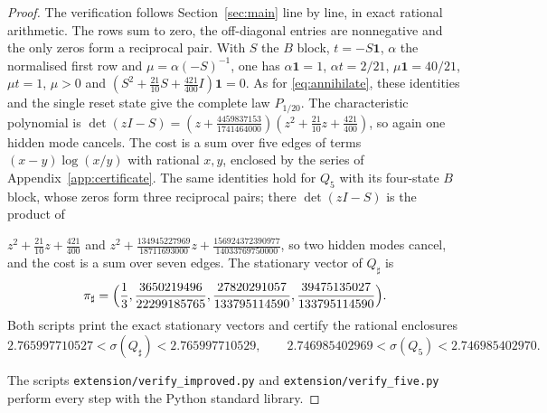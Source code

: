 \documentclass[11pt,a4paper]{article}
\theoremstyle{remark}\newtheorem{remark}[theorem]{Remark}
\newcommand{\one}{\mathbf 1}
\begin{document}
\begin{proof}
The verification follows Section~\ref{sec:main} line by line, in exact rational
arithmetic. The rows sum to zero, the off-diagonal entries are nonnegative and
the only zeros form a reciprocal pair. With $S$ the $B$ block,
$t=-S\one$, $\alpha$ the normalised first row and $\mu=\alpha(-S)^{-1}$,
one has $\alpha\one=1$, $\alpha t=2/21$, $\mu\one=40/21$, $\mu t=1$, $\mu>0$
and $(S^2+\tfrac{21}{10}S+\tfrac{421}{400}I)\one=0$. As for
\eqref{eq:annihilate}, these identities and the single reset state give the
complete law $P_{1/20}$. The characteristic polynomial is
$\det(zI-S)=(z+\tfrac{4459837153}{1741464000})(z^2+\tfrac{21}{10}z+\tfrac{421}{400})$,
so again one hidden mode cancels. The cost is a sum over five edges of terms
$(x-y)\log(x/y)$ with rational $x,y$, enclosed by the series of
Appendix~\ref{app:certificate}. The same identities hold for $Q_5$ with its
four-state $B$ block, whose zeros form three reciprocal pairs; there
$\det(zI-S)$ is the product of

$z^2+\tfrac{21}{10}z+\tfrac{421}{400}$ and
$z^2+\tfrac{134945227969}{18711693000}z+\tfrac{156924372390977}{14033769750000}$,
so two hidden modes cancel, and the cost is a sum over seven edges.
The stationary vector of $Q_\sharp$ is
\[
 \pi_\sharp=\Bigl(\frac13,\frac{3650219496}{22299185765},
 \frac{27820291057}{133795114590},\frac{39475135027}{133795114590}\Bigr).
\]
Both scripts print the exact stationary vectors and certify the rational
enclosures
\[
 2.765997710527<\sigma(Q_\sharp)<2.765997710529,\qquad
 2.746985402969<\sigma(Q_5)<2.746985402970.
\]

 The scripts \texttt{extension/verify\_improved.py} and
\texttt{extension/verify\_five.py} perform every step with the Python standard
library.

\end{proof}
\end{document}
